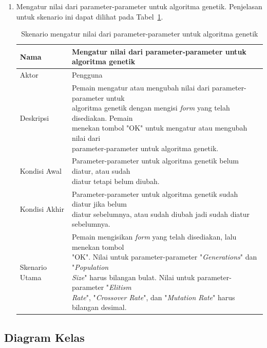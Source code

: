 \begin{enumerate}
\item Mengatur nilai dari parameter-parameter untuk algoritma genetik. Penjelasan untuk skenario ini dapat dilihat pada Tabel~\ref{tab:analisissetparameters}.

\begin{table}
\centering
\captionsetup{justification=centering}
\caption[Skenario mengatur nilai dari parameter-parameter untuk algoritma genetik]{Skenario mengatur nilai dari parameter-parameter untuk algoritma genetik}
\begin{tabular}{| l || l |}
\hline
Nama & Mengatur nilai dari parameter-parameter untuk algoritma genetik \\
\hline
Aktor & Pengguna \\
\hline
Deskripsi & \makecell[l]{Pemain mengatur atau mengubah nilai dari parameter-parameter untuk \\ algoritma genetik dengan mengisi \textit{form} yang telah disediakan. Pemain \\ menekan tombol "OK" untuk mengatur atau mengubah nilai dari \\ parameter-parameter untuk algoritma genetik.} \\
\hline
Kondisi Awal & \makecell[l]{Parameter-parameter untuk algoritma genetik belum diatur, atau sudah \\ diatur tetapi belum diubah.} \\
\hline
Kondisi Akhir & \makecell[l]{Parameter-parameter untuk algoritma genetik sudah diatur jika belum \\ diatur sebelumnya, atau sudah diubah jadi sudah diatur sebelumnya.} \\
\hline
Skenario Utama & \makecell[l]{Pemain mengisikan \textit{form} yang telah disediakan, lalu menekan tombol \\ "OK". Nilai untuk parameter-parameter "\textit{Generations}" dan "\textit{Population} \\ \textit{Size}" harus bilangan bulat. Nilai untuk parameter-parameter "\textit{Elitism} \\ \textit{Rate}", "\textit{Crossover Rate}", dan "\textit{Mutation Rate}" harus bilangan desimal.}\\
\hline
\end{tabular}
\label{tab:analisissetparameters}
\end{table}

\end{enumerate}

\clearpage

\subsection{Diagram Kelas}
\label{sec:analisiskelas}

